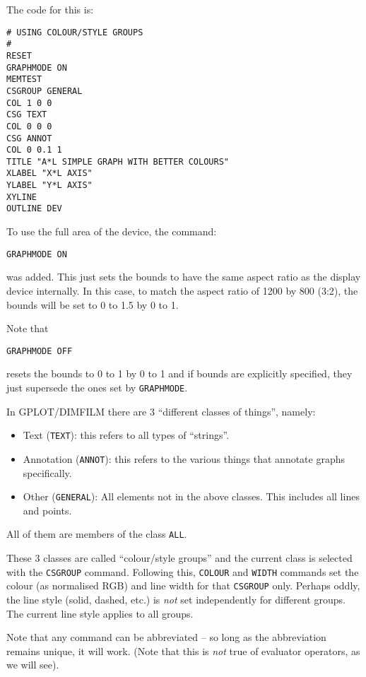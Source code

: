 \documentclass[a4paper,twoside,11pt]{article}
\newcommand{\newpara}{\par\vspace{4mm}\noindent}
\begin{document}
\newpara
The code for this is:
\begin{lstlisting}
# USING COLOUR/STYLE GROUPS
#
RESET
GRAPHMODE ON
MEMTEST
CSGROUP GENERAL
COL 1 0 0
CSG TEXT
COL 0 0 0
CSG ANNOT
COL 0 0.1 1
TITLE "A*L SIMPLE GRAPH WITH BETTER COLOURS"
XLABEL "X*L AXIS"
YLABEL "Y*L AXIS"
XYLINE
OUTLINE DEV
\end{lstlisting}

\newpara
To use the full area of the device, the command:
\begin{lstlisting}
GRAPHMODE ON
\end{lstlisting}

\newpara
was added. This just sets the bounds to have the same aspect ratio as
the display device internally. In this case, to match the aspect ratio
of 1200 by 800 (3:2), the bounds will be set to 0 to 1.5 by 0 to 1.

\newpara
Note that
\begin{lstlisting}
GRAPHMODE OFF
\end{lstlisting}
resets the bounds to 0 to 1 by 0 to 1 and if bounds are explicitly
specified, they just supersede the ones set by \texttt{GRAPHMODE}.

\newpara
In GPLOT/DIMFILM there are 3 ``different classes of things'', namely:
\begin{itemize}
\item
  Text (\texttt{TEXT}): this refers to all types of ``strings''.
\item
  Annotation (\texttt{ANNOT}): this refers to the various things that
  annotate graphs specifically.
\item
  Other (\texttt{GENERAL}): All elements not in the above classes. This
  includes all lines and points.
\end{itemize}
All of them are members of the class \texttt{ALL}.

\newpara
These 3 classes are called ``colour/style groups'' and the current class
is selected with the \texttt{CSGROUP} command. Following this,
\texttt{COLOUR} and \texttt{WIDTH} commands set the colour (as
normalised RGB) and line width for that \texttt{CSGROUP} only. Perhaps
oddly, the line style (solid, dashed, etc.) is \emph{not} set
independently for different groups. The current line style applies to
all groups.

\newpara
Note that any command can be abbreviated -- so long as the abbreviation
remains unique, it will work. (Note that this is \emph{not} true of
evaluator operators, as we will see).
\end{document}
